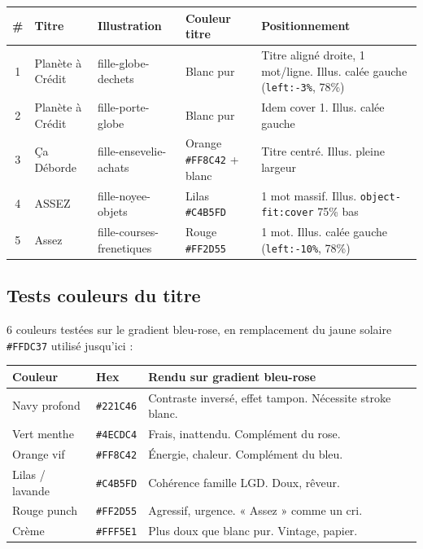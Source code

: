 \documentclass[a4paper,11pt]{article}
\newcommand{\tableheader}{\rowcolor{tableHeader}\bfseries}
\begin{document}
\begin{tcolorbox}[card]
\begin{tabularx}{\textwidth}{@{}clllX@{}}
\toprule
\tableheader \# & Titre & Illustration & Couleur titre & Positionnement \\
\midrule
1 & Planète à Crédit & fille-globe-dechets & Blanc pur & Titre aligné droite, 1 mot/ligne. Illus. calée gauche (\texttt{left:-3\%}, 78\%) \\
2 & Planète à Crédit & fille-porte-globe & Blanc pur & Idem cover 1. Illus. calée gauche \\
3 & Ça Déborde & fille-ensevelie-achats & Orange \texttt{\#FF8C42} + blanc & Titre centré. Illus. pleine largeur \\
4 & ASSEZ & fille-noyee-objets & Lilas \texttt{\#C4B5FD} & 1 mot massif. Illus. \texttt{object-fit:cover} 75\% bas \\
5 & Assez & fille-courses-frenetiques & Rouge \texttt{\#FF2D55} & 1 mot. Illus. calée gauche (\texttt{left:-10\%}, 78\%) \\
\bottomrule
\end{tabularx}
\end{tcolorbox}

\subsection{Tests couleurs du titre}

6 couleurs testées sur le gradient bleu-rose, en remplacement du jaune solaire \texttt{\#FFDC37} utilisé jusqu'ici :

\begin{tcolorbox}[card]
\begin{tabularx}{\textwidth}{@{}llX@{}}
\toprule
\tableheader Couleur & Hex & Rendu sur gradient bleu-rose \\
\midrule
Navy profond & \texttt{\#221C46} & Contraste inversé, effet tampon. Nécessite stroke blanc. \\
Vert menthe & \texttt{\#4ECDC4} & Frais, inattendu. Complément du rose. \\
Orange vif & \texttt{\#FF8C42} & Énergie, chaleur. Complément du bleu. \\
Lilas / lavande & \texttt{\#C4B5FD} & Cohérence famille LGD. Doux, rêveur. \\
Rouge punch & \texttt{\#FF2D55} & Agressif, urgence. « Assez » comme un cri. \\
Crème & \texttt{\#FFF5E1} & Plus doux que blanc pur. Vintage, papier. \\
\bottomrule
\end{tabularx}
\end{tcolorbox}
\end{document}
